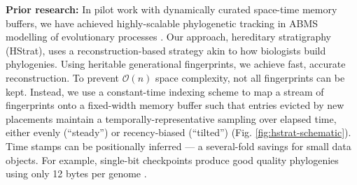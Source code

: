 
\vspace{.5em}
\noindent\textbf{Prior research:}
In pilot work with dynamically curated space-time memory buffers, we have achieved highly-scalable phylogenetic tracking in ABMS modelling of evolutionary processes \citep{morenoHstratPythonPackage2022, morenoHereditaryStratigraphyGenome2022}.
Our approach, hereditary stratigraphy (HStrat), uses a reconstruction-based strategy akin to how biologists build phylogenies.
Using heritable generational fingerprints, we achieve fast, accurate reconstruction.
To prevent $\mathcal{O}(n)$ space complexity, not all fingerprints can be kept.
Instead, we use a constant-time indexing scheme to map a stream of fingerprints onto a fixed-width memory buffer such that entries evicted by new placements maintain a temporally-representative sampling over elapsed time, either evenly (``steady'') or recency-biased (``tilted'') (Fig. \ref{fig:hstrat-schematic}).
Time stamps can be positionally inferred  --- a several-fold savings for small data objects. For example, single-bit checkpoints produce good quality phylogenies using only 12 bytes per genome \citep{moreno2023toward}.




